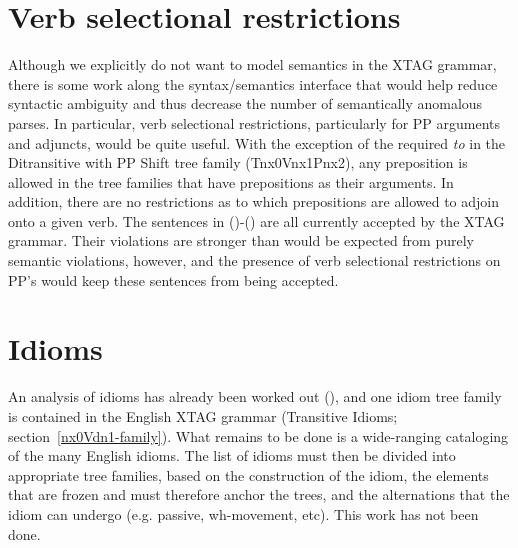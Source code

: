 \section{Verb selectional restrictions}

Although we explicitly do not want to model semantics in the XTAG grammar,
there is some work along the syntax/semantics interface that would help reduce
syntactic ambiguity and thus decrease the number of semantically anomalous
parses.  In particular, verb selectional restrictions, particularly for PP
arguments and adjuncts, would be quite useful.  With the exception of the
required {\it to} in the Ditransitive with PP Shift tree family (Tnx0Vnx1Pnx2),
any preposition is allowed in the tree families that have prepositions as their
arguments.  In addition, there are no restrictions as to which prepositions are
allowed to adjoin onto a given verb.  The sentences in ()-() are
all currently accepted by the XTAG grammar.  Their violations are stronger than
would be expected from purely semantic violations, however, and the presence of
verb selectional restrictions on PP's would keep these sentences from being
accepted.





\section{Idioms}

An analysis of idioms has already been worked out (\cite{AS89}), and one idiom
tree family is contained in the English XTAG grammar (Transitive Idioms;
section~\ref{nx0Vdn1-family}).  What remains to be done is a wide-ranging
cataloging of the many English idioms.  The list of idioms must then be divided
into appropriate tree families, based on the construction of the idiom, the
elements that are frozen and must therefore anchor the trees, and the
alternations that the idiom can undergo (e.g. passive, wh-movement, etc).  This
work has not been done.
